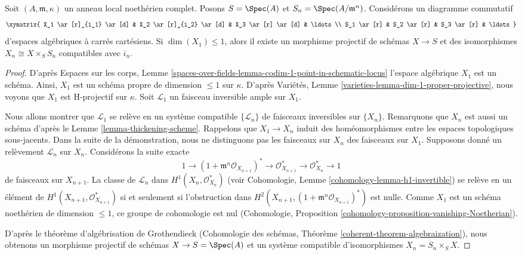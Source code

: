 \begin{lemma}
\label{lemma-formal-algebraic-space-proper-reldim-1}
Soit $(A, \mathfrak m, \kappa)$ un anneau local noethérien complet.
Posons $S = \Spec(A)$ et $S_n = \Spec(A/\mathfrak m^n)$.
Considérons un diagramme commutatif
$$
\xymatrix{
X_1 \ar[r]_{i_1} \ar[d] & X_2 \ar[r]_{i_2} \ar[d] & X_3 \ar[r] \ar[d] &
\ldots \\
S_1 \ar[r] & S_2 \ar[r] & S_3 \ar[r] & \ldots
}
$$
d'espaces algébriques à carrés cartésiens. Si $\dim(X_1) \leq 1$,
alors il existe un morphisme projectif de schémas $X \to S$
et des isomorphismes $X_n \cong X \times_S S_n$ compatibles avec $i_n$.
\end{lemma}

\begin{proof}
D'après Espaces sur les corps, Lemme
\ref{spaces-over-fields-lemma-codim-1-point-in-schematic-locus}
l'espace algébrique $X_1$ est un schéma. Ainsi, $X_1$
est un schéma propre de dimension $\leq 1$ sur $\kappa$.
D'après Variétés, Lemme \ref{varieties-lemma-dim-1-proper-projective},
nous voyons que $X_1$ est H-projectif sur $\kappa$.
Soit $\mathcal{L}_1$ un faisceau inversible ample sur $X_1$.

\medskip\noindent
Nous allons montrer que $\mathcal{L}_1$ se relève en un système compatible
$\{\mathcal{L}_n\}$ de faisceaux inversibles sur $\{X_n\}$.
Remarquons que $X_n$ est aussi un schéma d'après le Lemme \ref{lemma-thickening-scheme}.
Rappelons que $X_1 \to X_n$ induit des homéomorphismes entre les espaces
topologiques sous-jacents. Dans la suite de la démonstration, nous ne distinguons pas
les faisceaux sur $X_n$ des faisceaux sur $X_1$.
Supposons donné un relèvement $\mathcal{L}_n$ sur $X_n$. Considérons
la suite exacte
$$
1 \to
(1 + \mathfrak m^n\mathcal{O}_{X_{n + 1}})^* \to
\mathcal{O}_{X_{n + 1}}^* \to \mathcal{O}_{X_n}^* \to 1
$$
de faisceaux sur $X_{n + 1}$. La classe de $\mathcal{L}_n$ dans
$H^1(X_n, \mathcal{O}_{X_n}^*)$ (voir
Cohomologie, Lemme \ref{cohomology-lemma-h1-invertible})
se relève en un élément de $H^1(X_{n + 1}, \mathcal{O}_{X_{n + 1}}^*)$
si et seulement si l'obstruction dans
$H^2(X_{n + 1}, (1 + \mathfrak m^n\mathcal{O}_{X_{n + 1}})^*)$
est nulle. Comme $X_1$ est un schéma noethérien de dimension $\leq 1$,
ce groupe de cohomologie est nul (Cohomologie, Proposition
\ref{cohomology-proposition-vanishing-Noetherian}).

\medskip\noindent
D'après le théorème d'algébrisation de Grothendieck
(Cohomologie des schémas, Théorème \ref{coherent-theorem-algebraization}),
nous obtenons un morphisme projectif de schémas $X \to S = \Spec(A)$
et un système compatible d'isomorphismes $X_n = S_n \times_S X$.
\end{proof}

